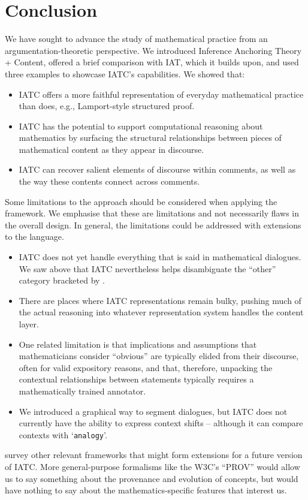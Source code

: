 \documentclass[smallextended,oneside]{svjour3}       %
\let\cite\citep
\newcommand\nothing[1]{#1}
\let\thesis\nothing
\let\paragraph\nothing
\begin{document}
\FloatBarrier
\section{Conclusion}\label{discussion}

\thesis{We have sought to advance the study of mathematical practice from an argumentation-theoretic perspective.}
We introduced Inference Anchoring Theory + Content,
offered a brief comparison with IAT, which it builds upon,
and used three examples to showcase IATC's capabilities.
We showed that:
\begin{itemize}
\item IATC offers a more faithful representation of everyday mathematical
  practice than does, e.g., Lamport-style structured proof.
\item IATC has the potential to support computational reasoning about mathematics by
  surfacing the structural relationships between pieces of
  mathematical content as they appear in discourse.
\item IATC can recover salient elements of discourse within comments, as
  well as the way these contents connect across comments.
\end{itemize}

\paragraph{Some limitations to the approach should be considered when applying the framework.}
We emphasise that these are limitations and not necessarily flaws in the
overall design.  In general, the limitations could be addressed with
extensions to the language.
\begin{itemize}
\item {IATC does not yet handle everything that is said in mathematical dialogues.}
We saw above that IATC nevertheless helps disambiguate the ``other'' category
bracketed by \citet{pease-and-martin}.  
\item {There are places where IATC representations remain bulky, pushing much of the actual reasoning into whatever representation system handles the content layer.}
\item {One related limitation is that implications and assumptions that mathematicians consider ``obvious'' are
typically elided from their discourse, often for valid expository reasons, and that, therefore, unpacking the contextual relationships between statements
typically requires a mathematically trained annotator.}
\item {We introduced a graphical way to segment dialogues, but IATC does not currently have the ability to express context shifts -- although it can compare contexts with `\texttt{analogy}'.}
\end{itemize}
\citet{corneli2018social} survey other relevant frameworks that might
form extensions for a future version of IATC.
More general-purpose formalisms like the W3C's
``PROV'' \cite{groth2013prov} would allow us to say something about
the provenance and evolution of concepts, but would have nothing to
say about the mathematics-specific features that interest us.
\end{document}
